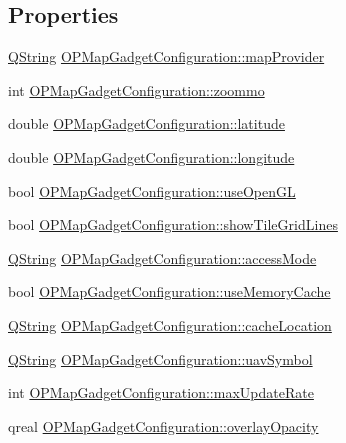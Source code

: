 \subsection*{\-Properties}
\begin{DoxyCompactItemize}
\item 
\hyperlink{group___u_a_v_objects_plugin_gab9d252f49c333c94a72f97ce3105a32d}{\-Q\-String} \hyperlink{group___o_p_map_plugin_ga6796d346f4d9edbe710a92a987f88659}{\-O\-P\-Map\-Gadget\-Configuration\-::map\-Provider}
\item 
int \hyperlink{group___o_p_map_plugin_gac07e4414a740f31223ffb1ce430ca3e8}{\-O\-P\-Map\-Gadget\-Configuration\-::zoommo}
\item 
double \hyperlink{group___o_p_map_plugin_gaadef11a946190d55fa1bc45821414b77}{\-O\-P\-Map\-Gadget\-Configuration\-::latitude}
\item 
double \hyperlink{group___o_p_map_plugin_ga7832a8e775f6e51898ad0075b150ccd5}{\-O\-P\-Map\-Gadget\-Configuration\-::longitude}
\item 
bool \hyperlink{group___o_p_map_plugin_gae922073575fb74cc0fa15b73223982ac}{\-O\-P\-Map\-Gadget\-Configuration\-::use\-Open\-G\-L}
\item 
bool \hyperlink{group___o_p_map_plugin_gaa46dc27228fb9c47c0c10f520d6099ab}{\-O\-P\-Map\-Gadget\-Configuration\-::show\-Tile\-Grid\-Lines}
\item 
\hyperlink{group___u_a_v_objects_plugin_gab9d252f49c333c94a72f97ce3105a32d}{\-Q\-String} \hyperlink{group___o_p_map_plugin_ga1b705326683a741d51646ad6c16a0687}{\-O\-P\-Map\-Gadget\-Configuration\-::access\-Mode}
\item 
bool \hyperlink{group___o_p_map_plugin_gae936e72883265ab40e9b30a0baaed122}{\-O\-P\-Map\-Gadget\-Configuration\-::use\-Memory\-Cache}
\item 
\hyperlink{group___u_a_v_objects_plugin_gab9d252f49c333c94a72f97ce3105a32d}{\-Q\-String} \hyperlink{group___o_p_map_plugin_ga182bffa488612f55a34e696590887dbf}{\-O\-P\-Map\-Gadget\-Configuration\-::cache\-Location}
\item 
\hyperlink{group___u_a_v_objects_plugin_gab9d252f49c333c94a72f97ce3105a32d}{\-Q\-String} \hyperlink{group___o_p_map_plugin_ga34e796aad89f226209a7325c28af859a}{\-O\-P\-Map\-Gadget\-Configuration\-::uav\-Symbol}
\item 
int \hyperlink{group___o_p_map_plugin_ga3ab3b510f0eb2b7cd3b183275eba0be1}{\-O\-P\-Map\-Gadget\-Configuration\-::max\-Update\-Rate}
\item 
qreal \hyperlink{group___o_p_map_plugin_gaf1bf43458d17cdb95a80a889c5508945}{\-O\-P\-Map\-Gadget\-Configuration\-::overlay\-Opacity}
\end{DoxyCompactItemize}


